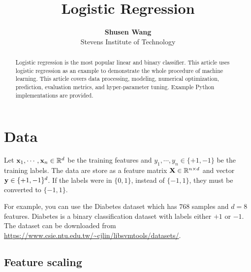 \documentclass[11pt]{article}
\numberwithin{equation}{section}
\def\X{{\bf X}}
\def\x{{\bf x}}
\def\y{{\bf y}}
\def\RB{{\mathbb R}}
\begin{document}


\title{Logistic Regression}

\author{\textbf{Shusen Wang} \\ Stevens Institute of Technology}


\maketitle

\begin{abstract}
	Logistic regression is the most popular linear and binary classifier.
	This article uses logistic regression as an example to demonstrate the whole procedure of machine learning.
	This article covers data processing, modeling, numerical optimization, prediction, evaluation metrics, and hyper-parameter tuning.
	Example Python implementations are provided. 
\end{abstract}

\section{Data}





Let $\x_1, \cdots , \x_n \in \RB^d$ be the training features and $y_1 , \cdots , y_n \in \{+1, -1\}$ be the training labels.
The data are store as a feature matrix $\X \in \RB^{n\times d}$ and vector $\y \in \{+1, -1\}^d$.
If the labels were in $\{0, 1\}$, instead of $\{-1, 1\}$, they must be converted to $\{-1, 1\}$.

For example, you can use the Diabetes dataset which has $768$ samples and $d=8$ features.
Diabetes is a binary classification dataset with labels either $+1$ or $-1$.
The dataset can be downloaded from \url{https://www.csie.ntu.edu.tw/~cjlin/libsvmtools/datasets/}.


\subsection*{Feature scaling}
\end{document}
